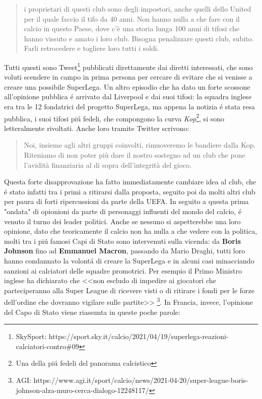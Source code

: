 \documentclass[
    corpo=12pt,
    oneside,
    evenboxes,
    tipotesi=triennale,
    stile=classica,
    oldstyle,
    autoretitolo,
    greek,
]{toptesi}
\begin{document}
\begin{interlinea}{1.5}
\begin{quote}
i proprietari di questi club sono degli impostori, anche quelli dello United per il quale faccio il tifo da 40 anni. Non hanno nulla a che fare con il 
calcio in questo Paese, dove c'è una storia lunga 100 anni di tifosi che hanno vissuto e amato i loro club. Bisogna penalizzare questi club, subito. 
Farli retrocedere e togliere loro tutti i soldi.\end{quote}
Tutti questi sono Tweet\footnote{SkySport: https://sport.sky.it/calcio/2021/04/19/superlega-reazioni-calciatori-contro\#09} pubblicati direttamente dai diretti interessati, 
che sono voluti scendere in campo in prima persona per cercare di evitare che si venisse a creare una possibile SuperLega.
Un altro episodio che ha dato un forte scossone all'opinione pubblica \'e arrivato dal Liverpool e dai suoi tifosi: la squadra inglese era
tra le 12 fondatrici del progetto SuperLega, ma appena la notizia \'e stata resa pubblica, i suoi tifosi pi\'u fedeli, che compongono la curva 
\emph{Kop}\footnote{Una della pi\'u fedeli del panorama calcistico}, si sono letteralmente rivoltati. Anche loro tramite 
Twitter scrivono: \begin{quote}\small Noi, insieme agli altri gruppi coinvolti, rimuoveremo le bandiere dalla Kop. Riteniamo di non poter più dare
il nostro sostegno ad un club che pone l'avidità finanziaria al di sopra dell'integrità del gioco.\end{quote}
Questa forte disapprovazione ha fatto immediatamente cambiare idea al club, che \'e stato infatti tra i primi a ritirarsi dalla proposta, seguito
poi da molti altri club per paura di forti ripercussioni da parte della UEFA.\newline
In seguito a questa prima "ondata" di opionioni da parte di personaggi influenti del mondo del calcio, \'e venuto il turno dei leader politici.
Anche se nessuno si aspetterebbe una loro opinione, dato che teoricamente il calcio non ha nulla a che vedere con la politica, molti tra i pi\'u 
famosi Capi di Stato sono intervenuti sulla vicenda: da \textbf{Boris Johnson} fino ad \textbf{Emmanuel Macron}, passando da Mario Draghi, tutti loro hanno condannato
la volont\'a di creare la SuperLega e in alcuni casi minacciando sanzioni ai calciatori delle squadre promotrici. Per esempio il Primo 
Ministro inglese ha dichiarato che <<non escludo di impedire ai giocatori che parteciperanno alla Super League di ricevere visti o di ritirare i fondi per le forze dell'ordine che dovranno vigilare sulle partite>>
\footnote{AGI: https://www.agi.it/sport/calcio/news/2021-04-20/super-league-boris-johnson-alza-muro-cerca-dialogo-12248117/}. In Francia, invece, l'opinione del Capo di Stato viene riassunta in queste poche parole:

\end{interlinea}
\end{document}

